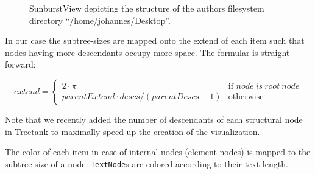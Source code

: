 \begin{itemize}
\begin{figure}[tb]
\caption{\label{fig:sunburstview} SunburstView depicting the structure of the authors filesystem directory ``/home/johannes/Desktop''.}
\end{figure}

In our case the subtree-sizes are mapped onto the extend of each item such that nodes having more descendants occupy more space. The formular is straight forward:

\begin{equation}
extend = \left\{ \begin{array}{cl}
2 \cdot \pi & \textrm{if }node\ is\ root\ node\\
parentExtend \cdot descs / (parentDescs - 1) & \textrm{otherwise}\end{array}\right.
\end{equation}

Note that we recently added the number of descendants of each structural node in Treetank to maximally speed up the creation of the visualization. 

The color of each item in case of internal nodes (element nodes) is mapped to the subtree-size of a node. \texttt{TextNode}s are colored according to their text-length.


\end{itemize}
